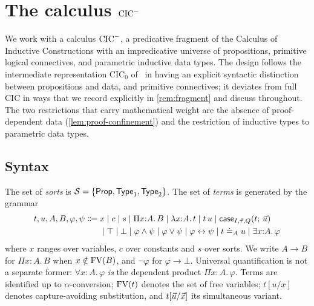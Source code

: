 \section{The calculus \texorpdfstring{$\mathrm{CIC}^{-}$}{CIC-}}
\label{sec:calculus}

We work with a calculus $\mathrm{CIC}^{-}$, a predicative fragment of the
Calculus of Inductive Constructions with an impredicative universe of
propositions, primitive logical connectives, and parametric inductive
data types.  The design follows the intermediate representation
$\mathrm{CIC}_0$ of~\cite{CzajkaKaliszyk2018} in having an explicit
syntactic distinction between propositions and data, and primitive
connectives; it deviates from full CIC in ways that we record
explicitly in \cref{rem:fragment} and discuss throughout.  The two
restrictions that carry mathematical weight are the absence of
proof-dependent data (\cref{lem:proof-confinement}) and the
restriction of inductive types to parametric data types.

\subsection{Syntax}

\begin{definition}
\label{def:terms}
The set of \emph{sorts} is $\mathcal{S} = \{\mathsf{Prop}, \mathsf{Type}_1, \mathsf{Type}_2\}$.
The set of \emph{terms} is generated by the grammar
\begin{align*}
t,u,A,B,\varphi,\psi \Coloneqq{}
  & x \mid c \mid s \mid \Pi x{:}A.\,B \mid \lambda x{:}A.\,t \mid t\,u
    \mid \mathsf{case}_{I,\vec{\tau},Q}(t;\,\vec{u}) \\
  & \mid \top \mid \bot \mid \varphi \wedge \psi \mid \varphi \vee \psi
    \mid \varphi \leftrightarrow \psi \mid t \doteq_A u \mid \exists x{:}A.\,\varphi
\end{align*}
where $x$ ranges over variables, $c$ over constants and $s$ over
sorts.  We write $A \to B$ for $\Pi x{:}A.\,B$ when $x \notin \mathrm{FV}(B)$,
and $\neg\varphi$ for $\varphi \to \bot$.  Universal quantification is
not a separate former: $\forall x{:}A.\,\varphi$ \emph{is} the
dependent product $\Pi x{:}A.\,\varphi$.  Terms are identified up to
$\alpha$-conversion; $\mathrm{FV}(t)$ denotes the set of free variables;
$t[u/x]$ denotes capture-avoiding substitution, and $t[\vec{u}/\vec{x}]$
its simultaneous variant.
\end{definition}


